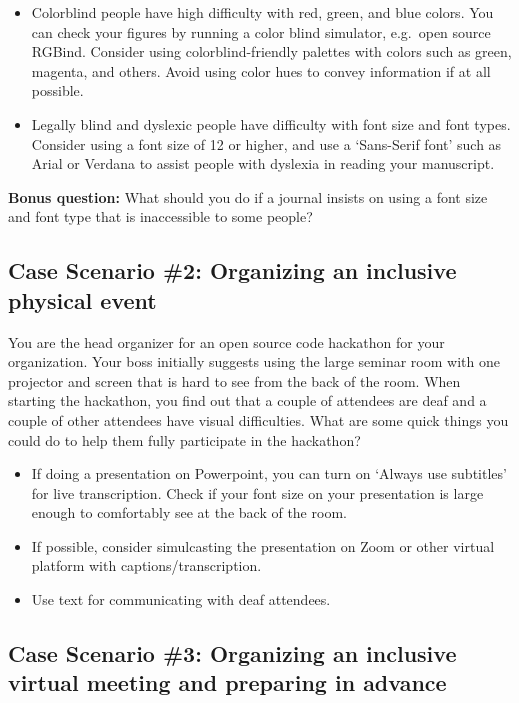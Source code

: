 \documentclass[
  letterpaper,
  DIV=11,
  numbers=noendperiod]{scrreport}
\providecommand{\tightlist}{%
  \setlength{\itemsep}{0pt}\setlength{\parskip}{0pt}}\usepackage{longtable,booktabs,array}
\begin{document}
\begin{itemize}
\tightlist
\item
  Colorblind people have high difficulty with red, green, and blue
  colors. You can check your figures by running a color blind simulator,
  e.g.~open source RGBind. Consider using colorblind-friendly palettes
  with colors such as green, magenta, and others. Avoid using color hues
  to convey information if at all possible.
\item
  Legally blind and dyslexic people have difficulty with font size and
  font types. Consider using a font size of 12 or higher, and use a
  `Sans-Serif font' such as Arial or Verdana to assist people with
  dyslexia in reading your manuscript.
\end{itemize}

\textbf{Bonus question:} What should you do if a journal insists on
using a font size and font type that is inaccessible to some people?

\hypertarget{case-scenario-2-organizing-an-inclusive-physical-event}{%
\subsection{Case Scenario \#2: Organizing an inclusive physical
event}\label{case-scenario-2-organizing-an-inclusive-physical-event}}

You are the head organizer for an open source code hackathon for your
organization. Your boss initially suggests using the large seminar room
with one projector and screen that is hard to see from the back of the
room. When starting the hackathon, you find out that a couple of
attendees are deaf and a couple of other attendees have visual
difficulties. What are some quick things you could do to help them fully
participate in the hackathon?

\begin{itemize}
\tightlist
\item
  If doing a presentation on Powerpoint, you can turn on `Always use
  subtitles' for live transcription. Check if your font size on your
  presentation is large enough to comfortably see at the back of the
  room.
\item
  If possible, consider simulcasting the presentation on Zoom or other
  virtual platform with captions/transcription.
\item
  Use text for communicating with deaf attendees.
\end{itemize}

\hypertarget{case-scenario-3-organizing-an-inclusive-virtual-meeting-and-preparing-in-advance}{%
\subsection{Case Scenario \#3: Organizing an inclusive virtual meeting
and preparing in
advance}\label{case-scenario-3-organizing-an-inclusive-virtual-meeting-and-preparing-in-advance}}
\end{document}
